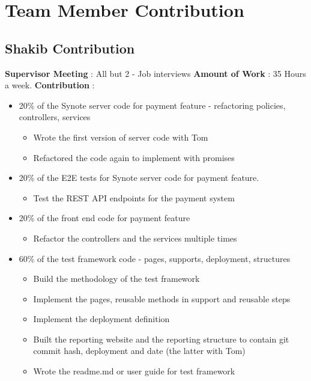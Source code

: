 \chapter{Team Member Contribution}
\label{appendix:team-member-contribution}

\section{Shakib Contribution}
\label{sec:shakib-contribution}

\textbf{Supervisor Meeting} : All but 2 - Job interviews
\newline
\textbf{Amount of Work} : 35 Hours a week.
\newline
\textbf{Contribution} :

\begin{itemize}
 \item 20\% of the Synote server code for payment feature - refactoring policies, controllers, services
 \begin{itemize}
  \item Wrote the first version of server code with Tom
  \item Refactored the code again to implement with promises
 \end{itemize}
 \item 20\% of the E2E tests for Synote server code for
  payment feature.
 \begin{itemize}
  \item Test the REST API endpoints for the payment system
 \end{itemize}
 \item 20\% of the front end code for payment feature
 \begin{itemize}
  \item Refactor the controllers and the services multiple times
 \end{itemize}
 \item 60\% of the test framework code - pages, supports, deployment, structures
 \begin{itemize}
  \item Build the methodology of the test framework
  \item Implement the pages, reusable methods in support and reusable steps
  \item Implement the deployment definition
  \item Built the reporting website and the reporting structure to contain git commit hash, deployment and date (the latter with Tom)
  \item Wrote the readme.md or user guide for test framework

\end{itemize}
\end{itemize}
